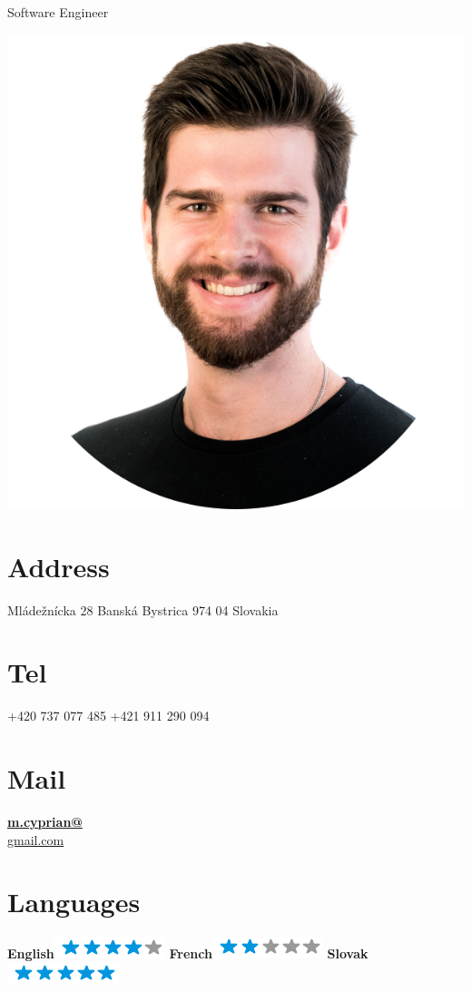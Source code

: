 \documentclass[]{friggeri-cv}
\begin{document}
      {Software Engineer}


\begin{aside}
  \includegraphics[scale=0.18]{img/mcyprian.png}
  \section{Address}
    Mládežnícka 28
    Banská Bystrica
    974 04
    Slovakia
    ~
  \section{Tel}
    +420 737 077 485
    +421 911 290 094
    ~
  \section{Mail}
    \href{mailto:m.cyprian@gmail.com}{\textbf{m.cyprian@}\\gmail.com}
    ~
  \section{Languages}
    \textbf{English}\includegraphics[scale=0.40]{img/4stars.png}
    \textbf{French}\includegraphics[scale=0.40]{img/2stars.png}
    \textbf{Slovak}\includegraphics[scale=0.40]{img/5stars.png}
    ~

\end{aside}
\end{document}
